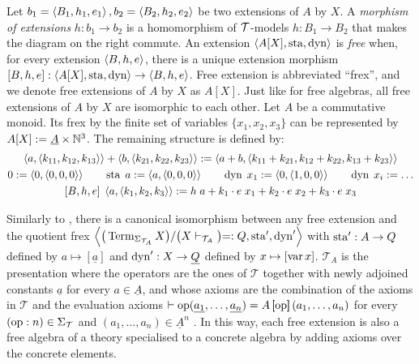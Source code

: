 \begin{figure}
\end{figure}
Let $b_1 = \left\langle B_1, h_1, e_1 \right\rangle, b_2 = \left\langle B_2, h_2, e_2 \right\rangle$ be two extensions of $A$ by $X$. A \emph{morphism of extensions} $h : b_1 \to b_2$ is a homomorphism of $\mathcal{T}$-models $h : B_1 \to B_2$ that makes the diagram on the right commute. An extension $\left\langle A[X], \operatorname{sta}, \operatorname{dyn} \right\rangle$ is \emph{free} when, for every extension $\left\langle B, h, e \right\rangle$, there is a unique extension morphism $[B, h, e] : \left\langle A[X], \operatorname{sta}, \operatorname{dyn} \right\rangle \to \left\langle B, h, e \right\rangle$. Free extension is abbreviated ``frex'', and we denote free extensions of $A$ by $X$ as $A[X]$. Just like for free algebras, all free extensions of $A$ by $X$ are isomorphic to each other. Let $A$ be a commutative monoid. Its frex by the finite set of variables $\{x_1, x_2, x_3\}$ can be represented by $A[X] := \underline{A} \times \mathbb N^3$. The remaining structure is defined by: \begin{gather*}
  \left\langle a, \left\langle k_{11}, k_{12}, k_{13} \right\rangle \right\rangle + \left\langle b, \left\langle k_{21}, k_{22}, k_{23} \right\rangle \right\rangle := \left\langle a + b, \left\langle k_{11} + k_{21}, k_{12} + k_{22}, k_{13} + k_{23} \right\rangle \right\rangle\\
  0 := \left\langle 0, \left\langle 0, 0, 0 \right\rangle \right\rangle \qquad \operatorname{sta}\; a := \left\langle a, \left\langle 0, 0, 0 \right\rangle \right\rangle \qquad \operatorname{dyn}\; x_1 := \left\langle 0, \left\langle 1, 0, 0 \right\rangle\right\rangle \qquad \operatorname{dyn}\; x_i := \dots\\
  [B, h, e]\; \left\langle a, \left\langle k_1, k_2, k_3 \right\rangle \right\rangle := h\; a + k_1 \cdot e\; x_1 + k_2 \cdot e\; x_2 + k_3 \cdot e\; x_3
\end{gather*}

Similarly to , there is a canonical isomorphism between any free extension and the quotient frex $\left\langle \bigr(\operatorname{Term}_{\Sigma_{\mathcal{T}_A}} X \bigl) / \bigr(X \vdash_{\mathcal{T}_A}\bigl) =: Q, \operatorname{sta}', \operatorname{dyn}' \right\rangle$ with ${\operatorname{sta}'} : {A} \to {Q}$ defined by ${a} \mapsto {[\underline{a}]}$ and ${\operatorname{dyn}'} : {X} \to \underline{Q}$ defined by ${x} \mapsto {[\operatorname{var}x]}$. $\mathcal{T}_A$ is the presentation where the operators are the ones of $\mathcal{T}$ together with newly adjoined constants $\underline{a}$ for every $a \in \underline{A}$, and whose axioms are the combination of the axioms in $\mathcal{T}$ and the evaluation axioms $\vdash \operatorname{op}(\underline{a_1}, \dots, \underline{a_n}) = A\left[\!\!\!\:\left[ \operatorname{op} \right]\!\!\!\:\right] (a_1, \dots, a_n)$ for every $(\operatorname{op} : n) \in \Sigma_\mathcal{T}$ and $(a_1, \dots, a_n) \in \underline{A}^n$ \parencite{involutive_frex}. In this way, each free extension is also a free algebra of a theory specialised to a concrete algebra by adding axioms over the concrete elements.

